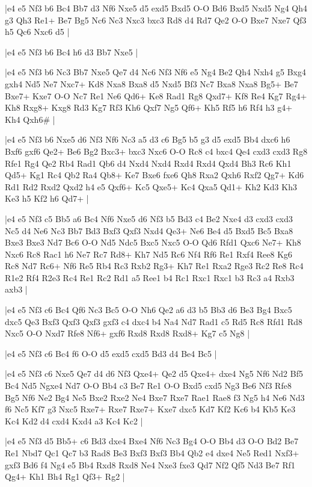 \whitename{}
\blackname{}
\makegametitle
|e4 e5 Nf3 b6 Bc4 Bb7 d3 Nf6 Nxe5 d5 exd5 Bxd5 O-O Bd6 Bxd5 Nxd5 Ng4 Qh4 g3 Qh3 Re1+ Be7 Bg5 Nc6 Nc3 Nxc3 bxc3 Rd8 d4 Rd7 Qe2 O-O Bxe7 Nxe7 Qf3 h5 Qc6 Nxc6 d5  |

\whitename{}
\blackname{}
\makegametitle
|e4 e5 Nf3 b6 Bc4 h6 d3 Bb7 Nxe5  |

\whitename{}
\blackname{}
\makegametitle
|e4 e5 Nf3 b6 Nc3 Bb7 Nxe5 Qe7 d4 Nc6 Nf3 Nf6 e5 Ng4 Be2 Qh4 Nxh4 g5 Bxg4 gxh4 Nd5 Ne7 Nxc7+ Kd8 Nxa8 Bxa8 d5 Nxd5 Bf3 Nc7 Bxa8 Nxa8 Bg5+ Be7 Bxe7+ Kxe7 O-O Nc7 Re1 Ne6 Qd6+ Ke8 Rad1 Rg8 Qxd7+ Kf8 Re4 Kg7 Rg4+ Kh8 Rxg8+ Kxg8 Rd3 Kg7 Rf3 Kh6 Qxf7 Ng5 Qf6+ Kh5 Rf5 h6 Rf4 h3 g4+ Kh4 Qxh6\#  |

\whitename{}
\blackname{}
\makegametitle
|e4 e5 Nf3 b6 Nxe5 d6 Nf3 Nf6 Nc3 a5 d3 c6 Bg5 b5 g3 d5 exd5 Bb4 dxc6 h6 Bxf6 gxf6 Qe2+ Be6 Bg2 Bxc3+ bxc3 Nxc6 O-O Rc8 c4 bxc4 Qe4 cxd3 cxd3 Rg8 Rfe1 Rg4 Qe2 Rb4 Rad1 Qb6 d4 Nxd4 Nxd4 Rxd4 Rxd4 Qxd4 Bh3 Rc6 Kh1 Qd5+ Kg1 Rc4 Qb2 Ra4 Qb8+ Ke7 Bxe6 fxe6 Qh8 Rxa2 Qxh6 Rxf2 Qg7+ Kd6 Rd1 Rd2 Rxd2 Qxd2 h4 e5 Qxf6+ Kc5 Qxe5+ Kc4 Qxa5 Qd1+ Kh2 Kd3 Kh3 Ke3 h5 Kf2 h6 Qd7+  |

\whitename{}
\blackname{}
\makegametitle
|e4 e5 Nf3 c5 Bb5 a6 Bc4 Nf6 Nxe5 d6 Nf3 b5 Bd3 c4 Be2 Nxe4 d3 cxd3 cxd3 Nc5 d4 Ne6 Nc3 Bb7 Bd3 Bxf3 Qxf3 Nxd4 Qe3+ Ne6 Be4 d5 Bxd5 Bc5 Bxa8 Bxe3 Bxe3 Nd7 Bc6 O-O Nd5 Ndc5 Bxc5 Nxc5 O-O Qd6 Rfd1 Qxc6 Ne7+ Kh8 Nxc6 Rc8 Rac1 h6 Ne7 Rc7 Rd8+ Kh7 Nd5 Rc6 Nf4 Rf6 Re1 Rxf4 Ree8 Kg6 Rc8 Nd7 Rc6+ Nf6 Re5 Rb4 Rc3 Rxb2 Rg3+ Kh7 Re1 Rxa2 Rge3 Rc2 Re8 Rc4 R1e2 Rf4 R2e3 Rc4 Re1 Rc2 Rd1 a5 Ree1 b4 Rc1 Rxc1 Rxc1 b3 Rc3 a4 Rxb3 axb3  |

\whitename{}
\blackname{}
\makegametitle
|e4 e5 Nf3 c6 Bc4 Qf6 Nc3 Bc5 O-O Nh6 Qe2 a6 d3 b5 Bb3 d6 Be3 Bg4 Bxc5 dxc5 Qe3 Bxf3 Qxf3 Qxf3 gxf3 c4 dxc4 b4 Na4 Nd7 Rad1 c5 Rd5 Rc8 Rfd1 Rd8 Nxc5 O-O Nxd7 Rfe8 Nf6+ gxf6 Rxd8 Rxd8 Rxd8+ Kg7 c5 Ng8  |

\whitename{}
\blackname{}
\makegametitle
|e4 e5 Nf3 c6 Bc4 f6 O-O d5 exd5 cxd5 Bd3 d4 Be4 Bc5  |

\whitename{}
\blackname{}
\makegametitle
|e4 e5 Nf3 c6 Nxe5 Qe7 d4 d6 Nf3 Qxe4+ Qe2 d5 Qxe4+ dxe4 Ng5 Nf6 Nd2 Bf5 Bc4 Nd5 Ngxe4 Nd7 O-O Bb4 c3 Be7 Re1 O-O Bxd5 cxd5 Ng3 Be6 Nf3 Rfe8 Bg5 Nf6 Ne2 Bg4 Ne5 Bxe2 Rxe2 Ne4 Bxe7 Rxe7 Rae1 Rae8 f3 Ng5 h4 Ne6 Nd3 f6 Nc5 Kf7 g3 Nxc5 Rxe7+ Rxe7 Rxe7+ Kxe7 dxc5 Kd7 Kf2 Kc6 b4 Kb5 Ke3 Kc4 Kd2 d4 cxd4 Kxd4 a3 Kc4 Kc2  |

\whitename{}
\blackname{}
\makegametitle
|e4 e5 Nf3 d5 Bb5+ c6 Bd3 dxe4 Bxe4 Nf6 Nc3 Bg4 O-O Bb4 d3 O-O Bd2 Be7 Re1 Nbd7 Qc1 Qc7 b3 Rad8 Be3 Bxf3 Bxf3 Bb4 Qb2 e4 dxe4 Ne5 Red1 Nxf3+ gxf3 Bd6 f4 Ng4 e5 Bb4 Rxd8 Rxd8 Ne4 Nxe3 fxe3 Qd7 Nf2 Qf5 Nd3 Be7 Rf1 Qg4+ Kh1 Bh4 Rg1 Qf3+ Rg2  |


